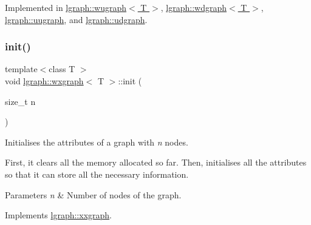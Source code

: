 Implemented in \hyperlink{classlgraph_1_1wugraph_a203b19538ef6662a793999973801be93}{lgraph\+::wugraph$<$ T $>$}, \hyperlink{classlgraph_1_1wdgraph_a0b0f9b2cec5dbdd7eb84305c588e31c1}{lgraph\+::wdgraph$<$ T $>$}, \hyperlink{classlgraph_1_1uugraph_a36bc44714a043830eff62b5aebe5a9c3}{lgraph\+::uugraph}, and \hyperlink{classlgraph_1_1udgraph_a31370a81898abdc230ad2a3b0d274187}{lgraph\+::udgraph}.

\mbox{\label{classlgraph_1_1wxgraph_aa09f37bf4a34a0f4f002587203df0125}} 
\subsubsection{\texorpdfstring{init()}{init()}\hspace{0.1cm}{\footnotesize\ttfamily [1/2]}}
{\footnotesize\ttfamily template$<$class T $>$ \\
void \hyperlink{classlgraph_1_1wxgraph}{lgraph\+::wxgraph}$<$ T $>$\+::init (\begin{DoxyParamCaption}\item[{size\+\_\+t}]{n }\end{DoxyParamCaption})\hspace{0.3cm}{\ttfamily [virtual]}}



Initialises the attributes of a graph with {\itshape n} nodes. 

First, it clears all the memory allocated so far. Then, initialises all the attributes so that it can store all the necessary information.


\begin{DoxyParams}{Parameters}
{\em n} & Number of nodes of the graph. \\
\hline
\end{DoxyParams}


Implements \hyperlink{classlgraph_1_1xxgraph_aba97900b2d33e1bb0d31594cf169f0ba}{lgraph\+::xxgraph}.

\mbox{\label{classlgraph_1_1wxgraph_a851ab43d7658c185831413394ef915a9}} 
